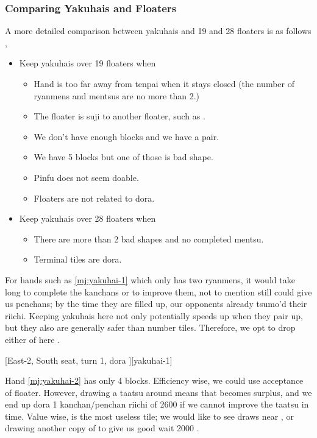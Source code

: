 \documentclass[12pt]{article}
\begin{document}
\subsubsection*{Comparing Yakuhais and Floaters}

A more detailed comparison between yakuhais and 19 and 28 floaters is as follows ,

\begin{itemize}
  \item Keep yakuhais over 19 floaters when
  \begin{itemize}
    \item Hand is too far away from tenpai when it stays closed (the number of ryanmens and mentsus are no more than 2.)
    \item The floater is suji to another floater, such as .
    \item We don't have enough blocks and we have a pair.
    \item We have 5 blocks but one of those is bad shape.
    \item Pinfu does not seem doable.
    \item Floaters are not related to dora.
  \end{itemize}
  \item Keep yakuhais over 28 floaters when
  \begin{itemize}
    \item There are more than 2 bad shapes and no completed mentsu.
    \item Terminal tiles are dora.
  \end{itemize}
\end{itemize}

For hands such as \ref{mj:yakuhai-1} which only has two ryanmens, it would take long to complete the kanchans or to improve them, not to mention  still could give us penchans; by the time they are filled up, our opponents already tsumo'd their riichi. Keeping yakuhais here not only potentially speeds up when they pair up, but they also are generally safer than number tiles. Therefore, we opt to drop either of  here \citep{yuusee-yakuand1}.

[East-2, South seat, turn 1, dora ][yakuhai-1]

Hand \ref{mj:yakuhai-2} has only 4 blocks. Efficiency wise, we could use  acceptance of  floater. However, drawing a taatsu around  means that  becomes surplus, and we end up dora 1 kanchan/penchan riichi of 2600 if we cannot improve the taatsu in time. Value wise,  is the most useless tile; we would like to see draws near , or drawing another copy of  to give us good wait 2000 \citep{yuusee-yakuand1}.
\end{document}

